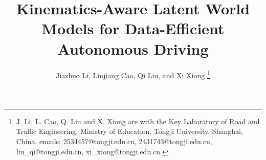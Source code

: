 \documentclass[letterpaper, 10 pt, conference]{ieeeconf}  %
\begin{document}
\title{\Large \bf Kinematics-Aware Latent World Models for Data-Efficient Autonomous Driving\\
}



\author{Jiazhuo Li, Linjiang Cao, Qi Liu, and Xi Xiong%
\thanks{J. Li, L. Cao, Q. Liu and X. Xiong are with the Key Laboratory of Road and Traffic Engineering, Ministry of Education, Tongji University, Shanghai, China, emails: 2534457@tongji.edu.cn, 2431743@tongji.edu.cn, liu\_qi@tongji.edu.cn, xi\_xiong@tongji.edu.cn.}
}
\maketitle
\end{document}
